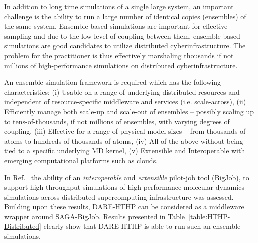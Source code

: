 \documentclass[]{svjour3}
\begin{document}
In addition to long time simulations of a single large system, an
important challenge is the ability to run a large number of identical
copies (ensembles) of the same system. Ensemble-based simulations are
important for effective sampling and due to the low-level of coupling
between them, ensemble-based simulations are good candidates to
utilize distributed cyberinfrastructure.  The problem for the
practitioner is thus effectively marshaling thousands if not millions
of high-performance simulations on distributed cyberinfrastructure.

An ensemble simulation framework is required which has the following
characteristics: (i) Usable on a range of underlying distributed
resources and independent of resource-specific middleware and services
(i.e. scale-across), (ii) Efficiently manage both scale-up and
scale-out of ensembles -- possibly scaling up to tens-of-thousands, if
not millions of ensembles, with varying degrees of coupling, (iii)
Effective for a range of physical model sizes -- from thousands of
atoms to hundreds of thousands of atoms, (iv) All of the above without
being tied to a specific underlying MD kernel, (v) Extensible and
Interoperable with emerging computational platforms such as
clouds. 

In Ref.~\cite{bigjob-ccgrid12} the ability of an {\it interoperable}
and {\it extensible} pilot-job tool (BigJob), to support
high-throughput simulations of high-performance molecular dynamics
simulations across distributed supercomputing infrastructure was
assessed.  Building upon these results, DARE-HTHP can be considered as
a middleware wrapper around SAGA-BigJob.  Results presented in
Table~\ref{table:HTHP-Distributed} clearly show that DARE-HTHP is able
to run such an ensemble simulations.



\end{document}

